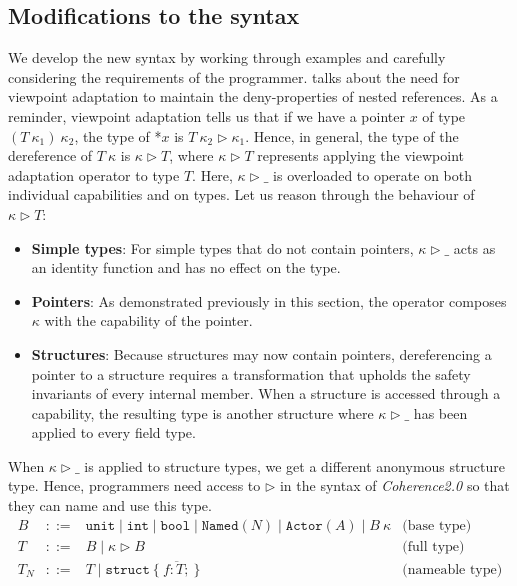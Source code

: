 \subsection{Modifications to the syntax}
We develop the new syntax by working through examples and carefully considering the requirements of the programmer.  talks about the need for viewpoint adaptation to maintain the deny-properties of nested references. As a reminder, viewpoint adaptation tells us that if we have a pointer $x$ of type $(T \ \kappa_1) \ \kappa_2$, the type of *$x$ is $T \ \kappa_2 \triangleright \kappa_1$. Hence, in general, the type of the dereference of $T \ \kappa$ is $\kappa \triangleright T$, where $\kappa \triangleright T$ represents applying the viewpoint adaptation operator to type $T$. Here, $\kappa \triangleright \_$ is overloaded to operate on both individual capabilities and on types. Let us reason through the behaviour of $\kappa \triangleright T$:
\begin{itemize}
  \item \textbf{Simple types}: For simple types that do not contain pointers, $\kappa \triangleright \_$ acts as an identity function and has no effect on the type.
  \item \textbf{Pointers}: As demonstrated previously in this section, the operator composes $\kappa$ with the capability of the pointer.
  \item \textbf{Structures}: Because structures may now contain pointers, dereferencing a pointer to a structure requires a transformation that upholds the safety invariants of every internal member. When a structure is accessed through a capability, the resulting type is another structure where $\kappa \triangleright \_$ has been applied to every field type.
\end{itemize}
When $\kappa \triangleright \_$ is applied to structure types, we get a different anonymous structure type. Hence, programmers need access to $\triangleright$ in the syntax of \textit{Coherence2.0} so that they can name and use this type.
\[
\begin{array}{lcll}
B & ::= & \mathtt{unit} \mid \mathtt{int} \mid \mathtt{bool} \mid \mathtt{Named}(N) \mid \mathtt{Actor}(A) \mid B\ \kappa & \text{(base type)} \\[0.5em]
T & ::= & B \mid \kappa \triangleright B\ & \text{(full type)} \\[0.5em]
T_N & ::= & T \mid \mathtt{struct}\ \{\ \overline{f : T;}\ \} & \text{(nameable type)}
\end{array}
\]
